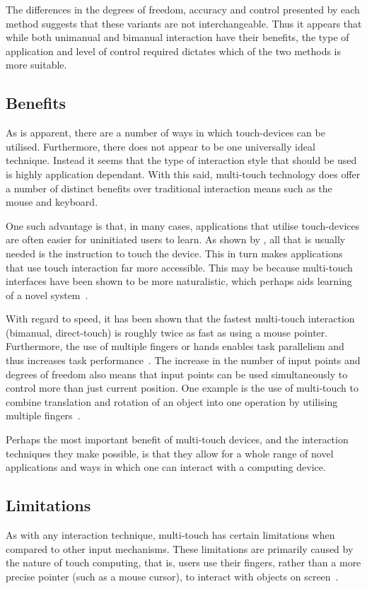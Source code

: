 The differences in the degrees of freedom, accuracy and control presented by each method suggests that these variants are not interchangeable. Thus it appears that while both unimanual and bimanual interaction have their benefits, the type of application and level of control required dictates which of the two methods is more suitable.

\subsection{Benefits}
As is apparent, there are a number of ways in which touch-devices can be utilised. Furthermore, there does not appear to be one universally ideal technique. Instead it seems that the type of interaction style that should be used is highly application dependant. With this said, multi-touch technology does offer a number of distinct benefits over traditional interaction means such as the mouse and keyboard.

One such advantage is that, in many cases, applications that utilise touch-devices are often easier for uninitiated users to learn. As shown by \citet{Mosc06}, all that is usually needed is the instruction to touch the device. This in turn makes applications that use touch interaction far more accessible. This may be because multi-touch interfaces have been shown to be more naturalistic, which perhaps aids learning of a novel system~\citep{Forl07}.

With regard to speed, it has been shown that the fastest multi-touch interaction (bimanual, direct-touch) is roughly twice as fast as using a mouse pointer. Furthermore, the use of multiple fingers or hands enables task parallelism and thus increases task performance~\citep{Kin09}. The increase in the number of input points and degrees of freedom also means that input points can be used simultaneously to control more than just current position. One example is the use of multi-touch to combine translation and rotation of an object into one operation by utilising multiple fingers~\citep{Mosc06}.

Perhaps the most important benefit of multi-touch devices, and the interaction techniques they make possible, is that they allow for a whole range of novel applications and ways in which one can interact with a computing device.

\subsection{Limitations}
As with any interaction technique, multi-touch has certain limitations when compared to other input mechanisms. These limitations are primarily caused by the nature of touch computing, that is, users use their fingers, rather than a more precise pointer (such as a mouse cursor), to interact with objects on screen~\citep{Mosc06}.

